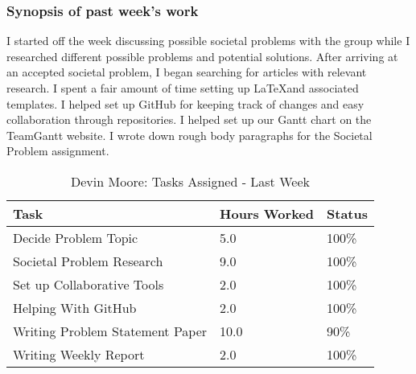 \documentclass[12pt,article,compsoc]{IEEEtran}
\begin{document}
	\subsubsection*{Synopsis of past week's work}

	I started off the week discussing possible societal problems with the group while I researched different possible problems and potential solutions. After arriving at an accepted societal problem, I began searching for articles with relevant research. I spent a fair amount of time setting up \LaTeX and associated templates. I helped set up GitHub for keeping track of changes and easy collaboration through repositories. I helped set up our Gantt chart on the TeamGantt website. I wrote down rough body paragraphs for the Societal Problem assignment.   


	\begin{table}[ht]
	\renewcommand{\arraystretch}{1.3}
		\caption{Devin Moore: Tasks Assigned - Last Week}
		
		\label{Summary of Devin Moore's activities: last week}
		
		\centering
		\begin{tabular}{p{5.5cm}|p{1cm}|p{1cm}}

		\hline
		\bfseries 	Task		 					& \bfseries Hours Worked	& \bfseries Status	\\
		\hline\hline

					Decide Problem Topic			& 5.0						& 100\%				\\	%
					Societal Problem Research		& 9.0						& 100\%				\\	%
					Set up Collaborative Tools		& 2.0						& 100\%				\\
					Helping With GitHub 			& 2.0						& 100\%				\\
					Writing Problem Statement Paper	& 10.0						& 90\%				\\
					Writing Weekly Report			& 2.0						& 100\%				\\	
		\hline	
		\end{tabular}
	\end{table}
\end{document}
